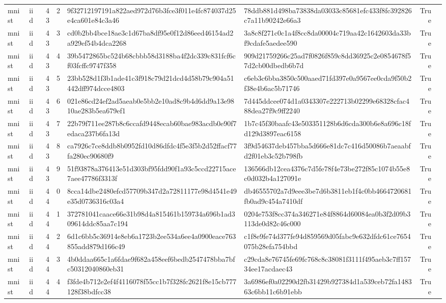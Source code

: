 \begin{tabular}{llrrllrl}
mnist & iid & 43 & 2 & 9f32712197191a822aed972d76b3fce3f011e4fc874037d25e4ca601e84c3a46 & 78ddb881d498ba73838da03033c85681efc433f8fc392826c7a11b90242e66a3 & True &  \\
mnist & iid & 43 & 3 & cd0b2bb4bce18ae3c1d67ba8df95e0f12d86eed46154ad2a929ef54b4dca2268 & 3a8c8f271c0c1a4f8cc8da00004c719aa42c1642603da33bf9cdafe5aedee590 & True &  \\
mnist & iid & 43 & 4 & 39b5472865bc524b68cbbb58d3188ba4f2dc339c831fcf6cf03fcffc9747f358 & 909d21759266c25ad7f0826f859c8dd36925c2e0854678f57d2cb00dbedb6b7d & True &  \\
mnist & iid & 43 & 5 & 23bb528d1f3b1ade41c3f918c79d21dcd4d58b79c904a51442dff974dcce4803 & c6eb3c6bba3850c500aaed71fd397e0a9567ee0cda9f50b2f38e4b6ac5b71746 & True &  \\
mnist & iid & 43 & 6 & 021e86cd24ef2ad5aeab0e5bb2e10ad8c9b4d6dd9a13e9810ae283b5ea679ef1 & 7d445ddcee074d1a0343307e222713b02299e68328cfac488dea27f9c9ff2240 & True &  \\
mnist & iid & 43 & 7 & 22b79f711ee287b8c6ccafd9448ecab60bae983acdb0e90f7edaca237b6fa13d & 1b7c45f30baafc43e503351128b6d6cda300b6e8a696c18fd129d3897eac6158 & True &  \\
mnist & iid & 43 & 8 & ca7926c7ce8ddb8b0952fd10d86dfdc4f5e3f5b2d52ffacf77fa280ec90680f9 & 3f9d54637deb457bba5d666e81dc7c416d50086b7aeaabfd2f01eb3c52b798fb & True &  \\
mnist & iid & 43 & 9 & 51f93878a376413e51d303bf95fdd90f1a93c5ccd22715ace7aee47786f3313f & 136566db12cea4376c7d5fe78f4e73be272f85c1074b55e8c0d032b4a127091e & True &  \\
mnist & iid & 44 & 0 & 8cca14dbe2480efcd57709b347d2a72811177e98d4541e49e35d0736316c03a4 & db46555702a7d9eee3be7d6b3811eb1f4c0bb4664720681fb0ad9c454a7410df & True &  \\
mnist & iid & 44 & 1 & 372781041caace66e31b98d4a815461b159734a696b1ad309614ddc85aa7c194 & 0204e753f8cc374a346271e84f8864d60084ea0b3f2d09b3113de0d82c46c000 & True &  \\
mnist & iid & 44 & 2 & 6d1c6bb5c36914e8eb6a1723b2ee534a6ee4a0900eace763855add879d166c49 & c1f8e9fe74d377fe94d859569d05fabc9e632dfdc61ce7654075b28efa754bbd & True &  \\
mnist & iid & 44 & 3 & 4b0ddaa665c1a6fdae9f682a458eef6bedb2547478bba7bfc50312040860eb31 & c29cda8e76745fe69fc768c8c38081f3111f495aeb3c7ff15734ee17acdaec43 & True &  \\
mnist & iid & 44 & 4 & f3fde4b712e2ef4f4116078f55cc1b7f328fc2621f8e15cb777128f38bdfcc38 & 3a6986ef0a02290d2fb31429b927384d1a539ceb72fa148363c6bb11c6b91ebb & True &  \\

\end{tabular}
